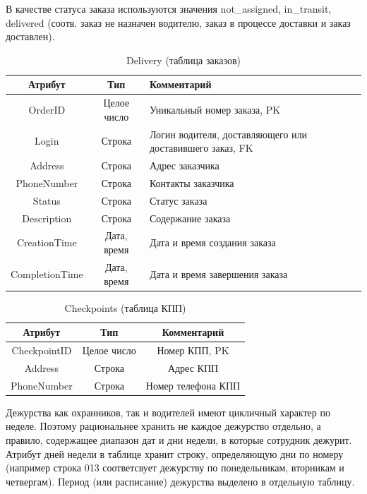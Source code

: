 В качестве статуса заказа используются значения not\_assigned, in\_transit, delivered (соотв. заказ не назначен водителю, заказ в процессе доставки и заказ доставлен).
\begin{table}[h!] 
	\begin{center}
		\caption{Delivery (таблица заказов)}
		\label{del_table}
		\begin{tabular}{| c | c | p{8cm} |}
			\hline
			\textbf{Атрибут}		&	\textbf{Тип}		& \textbf{Комментарий} \\
			\hline
			OrderID		&	Целое число	&	Уникальный номер заказа, PK \\ \hline
			Login 		&	Строка		&	Логин водителя, доставляющего или доставившего заказ, FK \\ \hline
			Address 	&	Строка 		&	Адрес заказчика \\ \hline
			PhoneNumber	&	Строка 		&	Контакты заказчика \\ \hline
			Status 		& 	Строка		&	Статус заказа \\ \hline
			Description	& 	Строка		&	Содержание заказа \\ \hline
			CreationTime	& Дата, время	&	Дата и время создания заказа \\ \hline
			CompletionTime	& Дата, время	&	Дата и время завершения заказа \\ \hline
		\end{tabular}
	\end{center}
\end{table}

\begin{table}[h!] 
	\begin{center}
		\caption{Checkpoints (таблица КПП)}
		\label{checkp_table}
		\begin{tabular}{| c | c | c |}
			\hline
			\textbf{Атрибут}		&	\textbf{Тип}		& \textbf{Комментарий} \\
			\hline
			CheckpointID	&	Целое число	&	Номер КПП, PK \\ \hline
			Address			&	Строка		&	Адрес КПП \\ \hline
			PhoneNumber		&	Строка		&	Номер телефона КПП \\ \hline
		\end{tabular}
	\end{center}
\end{table}


Дежурства как охранников, так и водителей имеют цикличный характер по неделе. Поэтому рациональнее хранить не каждое дежурство отдельно, а правило, содержащее диапазон дат и дни недели, в которые сотрудник дежурит. Атрибут дней недели в таблице хранит строку, определяющую дни по номеру (например строка 013 соответсвует дежурству по понедельникам, вторникам и четвергам). Период (или расписание) дежурства выделено в отдельную таблицу.

